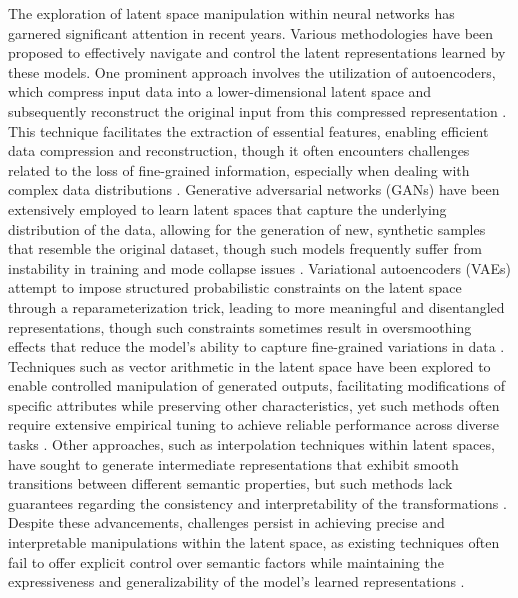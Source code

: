 \documentclass{article}
\begin{document}
The exploration of latent space manipulation within neural networks has garnered significant attention in recent years. Various methodologies have been proposed to effectively navigate and control the latent representations learned by these models. One prominent approach involves the utilization of autoencoders, which compress input data into a lower-dimensional latent space and subsequently reconstruct the original input from this compressed representation \cite{firstova2024investigating}. This technique facilitates the extraction of essential features, enabling efficient data compression and reconstruction, though it often encounters challenges related to the loss of fine-grained information, especially when dealing with complex data distributions \cite{hilabadu2024assessment}. Generative adversarial networks (GANs) have been extensively employed to learn latent spaces that capture the underlying distribution of the data, allowing for the generation of new, synthetic samples that resemble the original dataset, though such models frequently suffer from instability in training and mode collapse issues \cite{miana2024augmentation,keith2024optimizing}. Variational autoencoders (VAEs) attempt to impose structured probabilistic constraints on the latent space through a reparameterization trick, leading to more meaningful and disentangled representations, though such constraints sometimes result in oversmoothing effects that reduce the model’s ability to capture fine-grained variations in data \cite{monota2024optimizing}. Techniques such as vector arithmetic in the latent space have been explored to enable controlled manipulation of generated outputs, facilitating modifications of specific attributes while preserving other characteristics, yet such methods often require extensive empirical tuning to achieve reliable performance across diverse tasks \cite{xiong2024integrating,carrasco2024teaching}. Other approaches, such as interpolation techniques within latent spaces, have sought to generate intermediate representations that exhibit smooth transitions between different semantic properties, but such methods lack guarantees regarding the consistency and interpretability of the transformations \cite{yanid2024computation}. Despite these advancements, challenges persist in achieving precise and interpretable manipulations within the latent space, as existing techniques often fail to offer explicit control over semantic factors while maintaining the expressiveness and generalizability of the model’s learned representations \cite{ aqadah2024adaptive}. 
\end{document}
